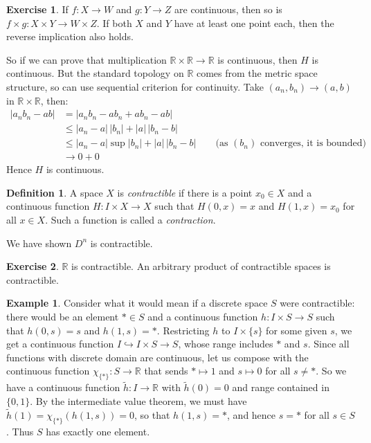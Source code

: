 \documentclass{tufte-handout}
\def\into {\hookrightarrow}
\def\RR{\mathbb{R}}
\theoremstyle{definition}
\newtheorem{definition}{Definition}
\newtheorem{example}{Example}
\newtheorem{ex}{Exercise}
\begin{document}
\begin{ex}
	If $f\colon X\to W$ and $g\colon Y\to Z$ are continuous, then so is $f\times g\colon X\times Y\to W\times Z$. 
	If both $X$ and $Y$ have at least one point each, then the reverse implication also holds.
\end{ex}

So if we can prove that multiplication $\RR\times \RR \to \RR$ is continuous, then $H$ is continuous.
But the standard topology on $\RR$ comes from the metric space structure, so can use sequential criterion for continuity.
Take $(a_n,b_n)\to (a,b)$ in $\RR\times \RR$, then:
\begin{align*}
	|a_nb_n - ab| 	& = |a_nb_n -ab_n + ab_n - ab| \\
			& \leq |a_n - a|\,|b_n| + |a|\,|b_n - b| \\
			& \leq |a_n-a| \sup|b_n| + |a| \, |b_n - b|\qquad\text{(as $(b_n)$ converges, it is bounded)} \\
			& \to 0+0  
\end{align*}
Hence $H$ is continuous.

\begin{definition}
	A space $X$ is \emph{contractible} if there is a point $x_0\in X$ and a continuous function $H\colon I\times X\to X$ such that $H(0,x) = x$ and $H(1,x) = x_0$ for all $x\in X$. 
Such a function is called a \emph{contraction}.
\end{definition}

We have shown $D^n$ is contractible.

\begin{ex}
$\RR$ is contractible. An arbitrary product of contractible spaces is contractible.
\end{ex}

\begin{example}
Consider what it would mean if a discrete space $S$ were contractible: there would be an element $*\in S$ and a continuous function $h\colon I\times S \to S$ such that $h(0,s) = s$ and $h(1,s) = *$. 
Restricting $h$ to $I\times \{s\}$ for some given $s$, we get a continuous function $I \into I\times S \to S$, whose range includes $*$ and $s$.
Since all functions with discrete domain are continuous, let us compose with the continuous function $\chi_{\{*\}}\colon S\to \RR$ that sends $*\mapsto 1$ and $s\mapsto 0$ for all $s\neq *$. 
So we have a continuous function $\widetilde{h}\colon I\to \RR$ with $\widetilde{h}(0)=0$ and range contained in $\{0,1\}$.
By the intermediate value theorem, we must have $\widetilde{h}(1) = \chi_{\{*\}}(h(1,s))= 0$, so that $h(1,s) = *$, and hence $s=*$ for all $s\in S$. 
Thus $S$ has exactly one element.
\end{example}
\end{document}
